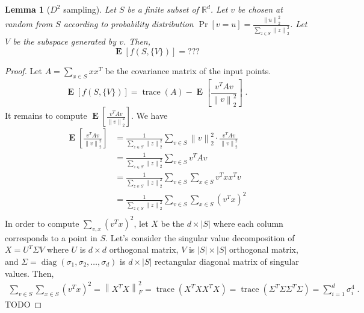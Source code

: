 \documentclass{article}
\newtheorem{lemma}[theorem]{Lemma}
\newcommand{\R}{\mathbb{R}}
\newcommand{\norm}[1]{\left\|#1\right\|}
\DeclareMathOperator*{\diag}{diag}
\DeclareMathOperator*{\trace}{trace}
\DeclareMathOperator*{\Exp}{\mathbf{E}}
\begin{document}
\begin{lemma}[$D^2$ sampling]
Let $S$ be a finite subset of $\R^d$. Let $v$ be chosen at random from $S$
according to probability distribution $\Pr[v = u] = \frac{\norm{u}_2^2}{\sum_{z \in S} \norm{z}_2^2}$.
Let $V$ be the subspace generated by $v$. Then,
$$
\Exp[f(S,\{V\})] = ???
$$
\end{lemma}

\begin{proof}
Let $A = \sum_{x \in S} xx^T$ be the covariance matrix of the input points.
$$
\Exp[f(S, \{V\})]
= \trace(A) - \Exp\left[ \frac{v^TAv}{\norm{v}_2^2} \right] \; .
$$
It remains to compute $\Exp[\frac{v^TAv}{\norm{v}_2^2}]$. We have
\begin{align*}
\Exp\left[ \frac{v^TAv}{\norm{v}_2^2} \right]
& = \frac{1}{\sum_{z \in S} \norm{z}_2^2} \sum_{v \in S} \norm{v}_2^2 \cdot \frac{v^T A v}{\norm{v}_2^2} \\
& = \frac{1}{\sum_{z \in S} \norm{z}_2^2} \sum_{v \in S} v^T A v \\
& = \frac{1}{\sum_{z \in S} \norm{z}_2^2} \sum_{v \in S} \sum_{x \in S} v^T x x^T v \\
& = \frac{1}{\sum_{z \in S} \norm{z}_2^2} \sum_{v \in S} \sum_{x \in S} (v^T x)^2 \\
\end{align*}
In order to compute $\sum_{v,x} (v^T x)^2$, let $X$ be the $d \times |S|$
where each column corresponds to a point in $S$.
Let's consider the singular value decomposition of $X = U^T \Sigma V$
where $U$ is $d \times d$ orthogonal matrix, $V$ is $|S| \times |S|$
orthogonal matrix, and $\Sigma = \diag(\sigma_1, \sigma_2, \dots, \sigma_d)$ is $d \times |S|$ rectangular
diagonal matrix of singular values. Then,
\begin{align*}
\sum_{v \in S} \sum_{x \in S} (v^T x)^2
= \norm{X^T X}_F^2 = \trace(X^T X X^T X) = \trace(\Sigma^T \Sigma \Sigma^T \Sigma) 
= \sum_{i=1}^d \sigma_i^4 \; .
\end{align*}
TODO
\end{proof}
\end{document}
